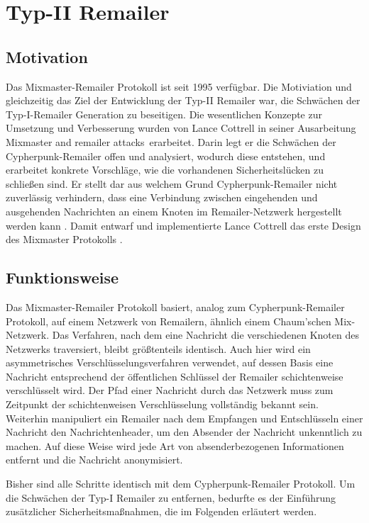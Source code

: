\chapter{Typ-II Remailer}
\section{Motivation}
Das Mixmaster-Remailer Protokoll ist seit 1995 verfügbar. Die Motiviation und gleichzeitig das Ziel der Entwicklung der Typ-II Remailer war, die Schwächen der Typ-I-Remailer Generation zu beseitigen. Die wesentlichen Konzepte zur Umsetzung und Verbesserung wurden von Lance Cottrell in seiner Ausarbeitung \glqq Mixmaster and remailer attacks\grqq ~erarbeitet. Darin legt er die Schwächen der Cypherpunk-Remailer offen und analysiert, wodurch diese entstehen, und erarbeitet konkrete Vorschläge, wie die vorhandenen Sicherheitslücken zu schließen sind. Er stellt dar aus welchem Grund Cypherpunk-Remailer nicht zuverlässig verhindern, dass eine Verbindung zwischen eingehenden und ausgehenden Nachrichten an einem Knoten im Remailer-Netzwerk hergestellt werden kann \cite[S. 276]{oram2001peer}. Damit entwarf und implementierte Lance Cottrell das erste Design des Mixmaster Protokolls \cite{mixmastermanpage}.

\section{Funktionsweise}
Das Mixmaster-Remailer Protokoll basiert, analog zum Cypherpunk-Remailer Protokoll, auf einem Netzwerk von Remailern, ähnlich einem Chaum'schen Mix-Netzwerk. Das Verfahren, nach dem eine Nachricht die verschiedenen Knoten des Netzwerks traversiert, bleibt größtenteils identisch. Auch hier wird ein asymmetrisches Verschlüsselungsverfahren verwendet, auf dessen Basis eine Nachricht entsprechend der öffentlichen Schlüssel der Remailer schichtenweise verschlüsselt wird. Der Pfad einer Nachricht durch das Netzwerk muss zum Zeitpunkt der schichtenweisen Verschlüsselung vollständig bekannt sein. Weiterhin manipuliert ein Remailer nach dem Empfangen und Entschlüsseln einer Nachricht den Nachrichtenheader, um den Absender der Nachricht unkenntlich zu machen. Auf diese Weise wird jede Art von absenderbezogenen Informationen entfernt und die Nachricht anonymisiert. 

Bisher sind alle Schritte identisch mit dem Cypherpunk-Remailer Protokoll. Um die Schwächen der Typ-I Remailer zu entfernen, bedurfte es der Einführung zusätzlicher Sicherheitsmaßnahmen, die im Folgenden erläutert werden.


